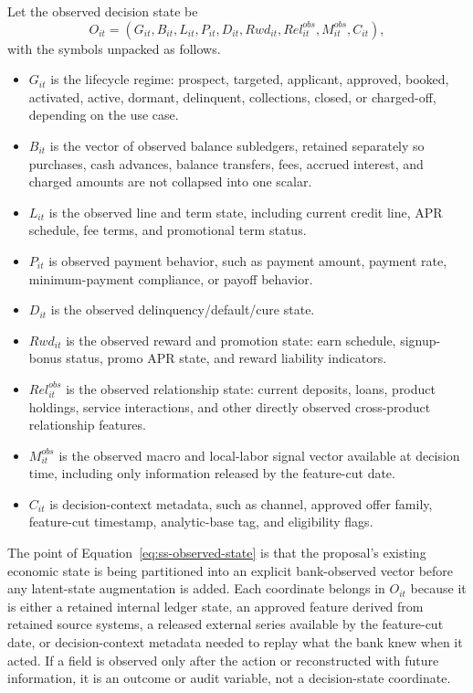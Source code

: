 \documentclass[11pt]{article}
\newcommand{\1}{\mathbf{1}}
\begin{document}
Let the observed decision state be
\begin{equation}
  O_{it}
  =
  (G_{it},B_{it},L_{it},P_{it},D_{it},Rwd_{it},Rel^{obs}_{it},M^{obs}_{it},C_{it}),
  \label{eq:ss-observed-state}
\end{equation}
with the symbols unpacked as follows.
\begin{itemize}[leftmargin=*]
  \item $G_{it}$ is the lifecycle regime: prospect, targeted, applicant,
        approved, booked, activated, active, dormant, delinquent, collections,
        closed, or charged-off, depending on the use case.
  \item $B_{it}$ is the vector of observed balance subledgers, retained
        separately so purchases, cash advances, balance transfers, fees,
        accrued interest, and charged amounts are not collapsed into one scalar.
  \item $L_{it}$ is the observed line and term state, including current credit
        line, APR schedule, fee terms, and promotional term status.
  \item $P_{it}$ is observed payment behavior, such as payment amount,
        payment rate, minimum-payment compliance, or payoff behavior.
  \item $D_{it}$ is the observed delinquency/default/cure state.
  \item $Rwd_{it}$ is the observed reward and promotion state: earn schedule,
        signup-bonus status, promo APR state, and reward liability indicators.
  \item $Rel^{obs}_{it}$ is the observed relationship state: current deposits,
        loans, product holdings, service interactions, and other directly
        observed cross-product relationship features.
  \item $M^{obs}_{it}$ is the observed macro and local-labor signal vector
        available at decision time, including only information released by the
        feature-cut date.
  \item $C_{it}$ is decision-context metadata, such as channel, approved offer
        family, feature-cut timestamp, analytic-base tag, and eligibility flags.
\end{itemize}
The point of Equation~\eqref{eq:ss-observed-state} is that the proposal's
existing economic state is being partitioned into an explicit bank-observed
vector before any latent-state augmentation is added.
Each coordinate belongs in $O_{it}$ because it is either a retained internal
ledger state, an approved feature derived from retained source systems, a
released external series available by the feature-cut date, or decision-context
metadata needed to replay what the bank knew when it acted. If a field is
observed only after the action or reconstructed with future information, it is
an outcome or audit variable, not a decision-state coordinate.
\end{document}
